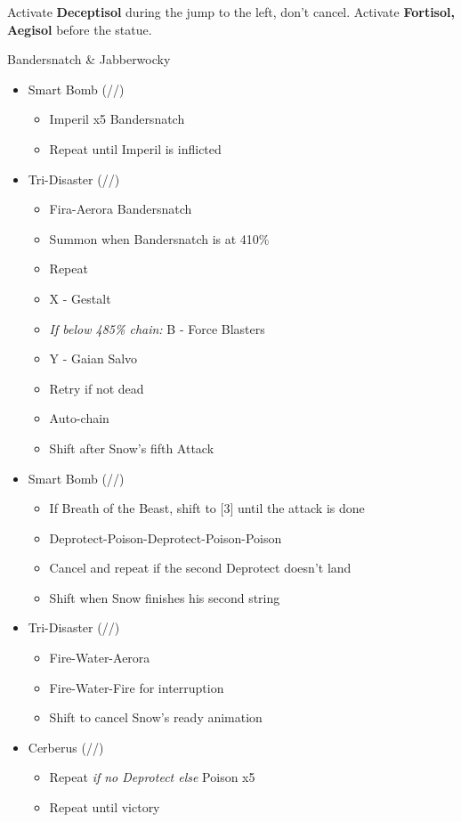 	Activate \textbf{Deceptisol} during the jump to the left, don't cancel.
	Activate \textbf{Fortisol, Aegisol} before the statue.
	\vfill
	\renewcommand{\first}{[1] Malevolence (\rav/\rav/\syn)}
	\renewcommand{\second}{[2] Cerberus (\com/\com/\com)}
	\renewcommand{\third}{[3] Mystic Tower (\rav/\sen/\rav)}
	\renewcommand{\fifth}{[5] Smart Bomb (\sab/\rav/\rav)}
	\renewcommand{\sixth}{[6] Tri-Disaster (\rav/\rav/\rav)}
	\begin{battle}[0:55]{Bandersnatch \& Jabberwocky}
		\begin{itemize}
			\item \fifth
			      \begin{itemize}
				      \item Imperil x5 Bandersnatch
				      \item Repeat until Imperil is inflicted
			      \end{itemize}
			\item \sixth
			      \begin{itemize}
					\item Fira-Aerora Bandersnatch
				      \item Summon when Bandersnatch is at 410\%
				      \item Repeat
				      \item X - Gestalt
				      \item {\it If below 485\% chain:} B - Force Blasters
				      \item Y - Gaian Salvo
				      \item Retry if not dead
				      \item Auto-chain
				      \item Shift after Snow's fifth Attack
			      \end{itemize}
			\item \fifth
			      \begin{itemize}
				      \item If Breath of the Beast, shift to [3] until the attack is done
				      \item Deprotect-Poison-Deprotect-Poison-Poison
				      \item Cancel and repeat if the second Deprotect doesn't land
				      \item Shift when Snow finishes his second string
			      \end{itemize}
			\item \sixth
			      \begin{itemize}
				      \item Fire-Water-Aerora
				      \item Fire-Water-Fire for interruption
				      \item Shift to cancel Snow's ready animation
			      \end{itemize}
			\item \second
			      \begin{itemize}
				      \item Repeat \textit{if no Deprotect else }Poison x5
				      \item Repeat until victory
			      \end{itemize}
		\end{itemize}
	\end{battle}
